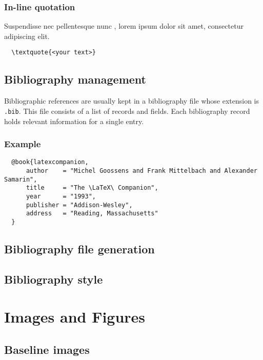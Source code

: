 \subsubsection{In-line quotation}

Suspendisse nec pellentesque nunc , lorem ipsum dolor sit amet, consectetur adipiscing elit.

\begin{lstlisting}
  \textquote{<your text>}
\end{lstlisting}

\subsection{Bibliography management}

Bibliographic references are usually kept in a bibliography file whose extension is \verb|.bib|. This file consists of a list of records and fields. Each bibliography record holds relevant information for a single entry.

\subsubsection{Example}

\begin{lstlisting}
  @book{latexcompanion,
      author    = "Michel Goossens and Frank Mittelbach and Alexander Samarin",
      title     = "The \LaTeX\ Companion",
      year      = "1993",
      publisher = "Addison-Wesley",
      address   = "Reading, Massachusetts"
  }
\end{lstlisting}

\subsection{Bibliography file generation}

\subsection{Bibliography style}

\section{Images and Figures}

\subsection{Baseline images}

